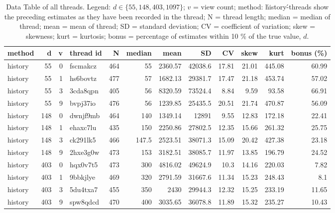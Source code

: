 \documentclass[9pt,a4paper,twocolumn,lineno]{article}
\begin{document}
\newpage

\begin{table}\centering
\caption{Data Table of all threads. Legend: $d \in \{55, 148, 403, 1097\}$; $v$ = view count; method: \'history\'-threads show the preceding estimates as they have been recorded in the thread; N = thread length; median = median of thread; mean = mean of thread; SD = standard deviation; CV = coefficient of variation; skew = skewness; kurt = kurtosis; bonus = percentage of estimates within 10 \% of the true value, $d$.}

\begin{tabular}{lrrlrrrrrrrr}
\hline
 method   &    d &   v & thread id  &   N &   median &     mean &       SD &    CV &   skew &   kurt &   bonus (\%) \\
\hline
 history  &   55 &   0 & fscmakcz & 464 &     55   &  2360.57 & 42038.6  & 17.81 &  21.01 & 445.08 &        60.99 \\
 history  &   55 &   1 & hs6bovtz & 477 &     57   &  1682.13 & 29381.7  & 17.47 &  21.18 & 453.74 &        57.02 \\
 history  &   55 &   3 & 3cda8qpn & 405 &     56   &  8320.59 & 73524.4  &  8.84 &   9.59 &  93.58 &        66.91 \\
 history  &   55 &   9 & bvpj37io & 476 &     56   &  1239.85 & 25435.5  & 20.51 &  21.74 & 470.87 &        56.09 \\
 history  &  148 &   0 & dwnjf9mb & 464 &    140   &  1349.14 & 12891    &  9.55 &  12.83 & 172.18 &        22.41 \\
 history  &  148 &   1 & ehaxc7lu & 435 &    150   &  2250.86 & 27802.5  & 12.35 &  15.66 & 261.32 &        25.75 \\
 history  &  148 &   3 & ck291lk5 & 466 &    147.5 &  2523.51 & 38071.3  & 15.09 &  20.42 & 427.38 &        23.18 \\
 history  &  148 &   9 & 2hxe3g0w & 473 &    153   &  3182.51 & 38085.7  & 11.97 &  13.85 & 196.79 &        24.52 \\
 history  &  403 &   0 & hqx0v7t5 & 473 &    300   &  4816.02 & 49624.9  & 10.3  &  14.16 & 220.03 &         7.82 \\
 history  &  403 &   1 & 9bbkjlye & 469 &    320   &  2791.59 & 31667.6  & 11.34 &  15.23 & 248.43 &         8.1  \\
 history  &  403 &   3 & 5du4txa7 & 455 &    350   &  2430    & 29944.3  & 12.32 &  15.25 & 233.19 &        11.65 \\
 history  &  403 &   9 & spw8qdcd & 470 &    400   &  3035.65 & 36078.8  & 11.89 &  15.32 & 235.27 &        10.43 \\

\end{tabular}
\end{table}
\end{document}
